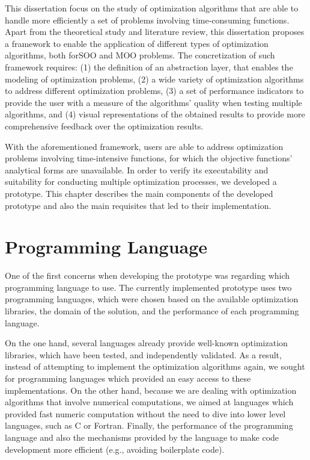 \cleardoublepage
\label{chap:architecture}

This dissertation focus on the study of optimization algorithms that are able to handle more efficiently a set of problems involving time-consuming functions. Apart from the theoretical study and literature review, this dissertation proposes a framework to enable the application of different types of optimization algorithms, both for\ac{SOO} and \ac{MOO} problems. The concretization of such framework requires: (1) the definition of an abstraction layer, that enables the modeling of optimization problems, (2) a wide variety of optimization algorithms to address different optimization problems, (3) a set of performance indicators to provide the user with a measure of the algorithms' quality when testing multiple algorithms, and (4) visual representations of the obtained results to provide more comprehensive feedback over the optimization results.   

With the aforementioned framework, users are able to address optimization problems involving time-intensive functions, for which the objective functions' analytical forms are unavailable. In order to verify its executability and suitability for conducting multiple optimization processes, we developed a prototype. This chapter describes the main components of the developed prototype and also the main requisites that led to their implementation. 

\section{Programming Language}

One of the first concerns when developing the prototype was regarding which programming language to use. The currently implemented prototype uses two programming languages, which were chosen based on the available optimization libraries, the domain of the solution, and the performance of each programming language.
 
On the one hand, several languages already provide well-known optimization libraries, which have been tested, and independently validated. As a result, instead of attempting to implement the optimization algorithms again, we sought for programming languages which provided an easy access to these implementations. On the other hand, because we are dealing with optimization algorithms that involve numerical computations, we aimed at languages which provided fast numeric computation without the need to dive into lower level languages, such as C or Fortran. Finally, the performance of the programming language and also the mechanisms provided by the language to make code development more efficient (e.g., avoiding boilerplate code).

